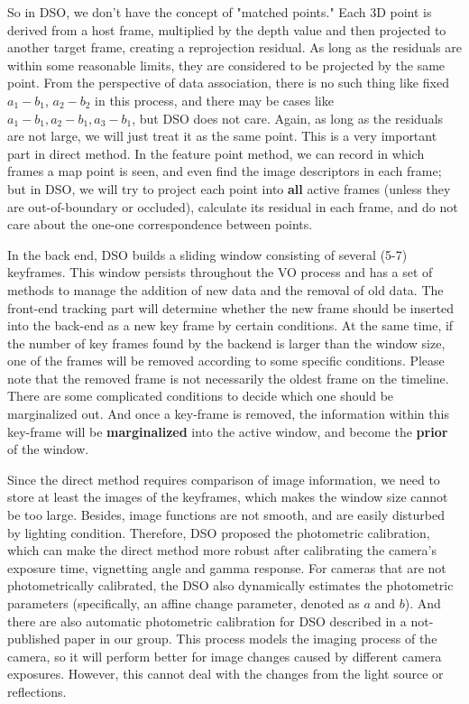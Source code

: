 \documentclass[a4paper,10pt]{article}
\begin{document}
	So in DSO, we don't have the concept of "matched points." Each 3D point is derived from a host frame, multiplied by the depth value and then projected to another target frame,  creating a reprojection residual. As long as the residuals are within some reasonable limits, they are considered to be projected by the same point. From the perspective of data association, there is no such thing like fixed $a_1-b_1$, $a_2-b_2$ in this process, and there may be cases like $a_1-b_1, a_2-b_1, a_3-b_1$, but DSO does not care. Again, as long as the residuals are not large, we will just treat it as the same point. This is a very important part in direct method. In the feature point method, we can record in which frames a map point is seen, and even find the image descriptors in each frame; but in DSO, we will try to project each point into \textbf{all} active frames (unless they are out-of-boundary or occluded), calculate its residual in each frame, and do not care about the one-one correspondence between points.
	
	In the back end, DSO builds a sliding window consisting of several (5-7) keyframes. This window persists throughout the VO process and has a set of methods to manage the addition of new data and the removal of old data. The front-end tracking part will determine whether the new frame should be inserted into the back-end as a new key frame by certain conditions. At the same time, if the number of key frames found by the backend is larger than the window size, one of the frames will be removed according to some specific conditions. Please note that the removed frame is not necessarily the oldest frame on the timeline. There are some complicated conditions to decide which one should be marginalized out. And once a key-frame is removed, the information within this key-frame will be \textbf{marginalized} into the active window, and become the \textbf{prior} of the window. 
	
	Since the direct method requires comparison of image information, we need to store at least the images of the keyframes, which makes the window size cannot be too large. Besides, image functions are not smooth, and are easily disturbed by lighting condition. Therefore, DSO proposed the photometric calibration, which can make the direct method more robust after calibrating the camera's exposure time, vignetting angle and gamma response. For cameras that are not photometrically calibrated, the DSO also dynamically estimates the photometric parameters (specifically, an affine change parameter, denoted as $a$ and $b$). And there are also automatic photometric calibration for DSO described in a not-published paper in our group. This process models the imaging process of the camera, so it will perform better for image changes caused by different camera exposures. However, this cannot deal with the changes from the light source or reflections.
\end{document}
